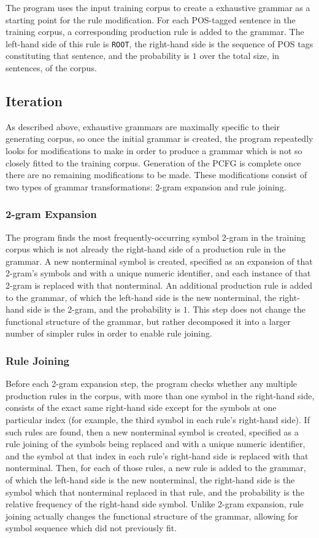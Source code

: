 \documentclass[paper=a4, fontsize=11pt]{scrartcl} %
\numberwithin{equation}{section} %
\numberwithin{figure}{section} %
\numberwithin{table}{section} %
\begin{document}
The program uses the input training corpus to create a exhaustive grammar as a starting point for the rule modification. For each POS-tagged sentence in the training corpus, a corresponding production rule is added to the grammar. The left-hand side of this rule is \texttt{ROOT}, the right-hand side is the sequence of POS tags constituting that sentence, and the probability is $1$ over the total size, in sentences, of the corpus.
\subsection{Iteration}

As described above, exhaustive grammars are maximally specific to their generating corpus, so once the initial grammar is created, the program repeatedly looks for modifications to make in order to produce a grammar which is not so closely fitted to the training corpus. Generation of the PCFG is complete once there are no remaining modifications to be made. These modifications consist of two types of grammar transformations: 2-gram expansion and rule joining.

\subsubsection{2-gram Expansion}

The program finds the most frequently-occurring symbol 2-gram in the training corpus which is not already the right-hand side of a production rule in the grammar. A new nonterminal symbol is created, specified as an expansion of that 2-gram's symbols and with a unique numeric identifier, and each instance of that 2-gram is replaced with that nonterminal. An additional production rule is added to the grammar, of which the left-hand side is the new nonterminal, the right-hand side is the 2-gram, and the probability is $1$. This step does not change the functional structure of the grammar, but rather decomposed it into a larger number of simpler rules in order to enable rule joining.

\subsubsection{Rule Joining}

Before each 2-gram expansion step, the program checks whether any multiple production rules in the corpus, with more than one symbol in the right-hand side, consists of the exact same right-hand side except for the symbols at one particular index (for example, the third symbol in each rule's right-hand side). If such rules are found, then a new nonterminal symbol is created, specified as a rule joining of the symbols being replaced and with a unique numeric identifier, and the symbol at that index in each rule's right-hand side is replaced with that nonterminal. Then, for each of those rules, a new rule is added to the grammar, of which the left-hand side is the new nonterminal, the right-hand side is the symbol which that nonterminal replaced in that rule, and the probability is the relative frequency of the right-hand side symbol. Unlike 2-gram expansion, rule joining actually changes the functional structure of the grammar, allowing for symbol sequence which did not previously fit.
\end{document}
